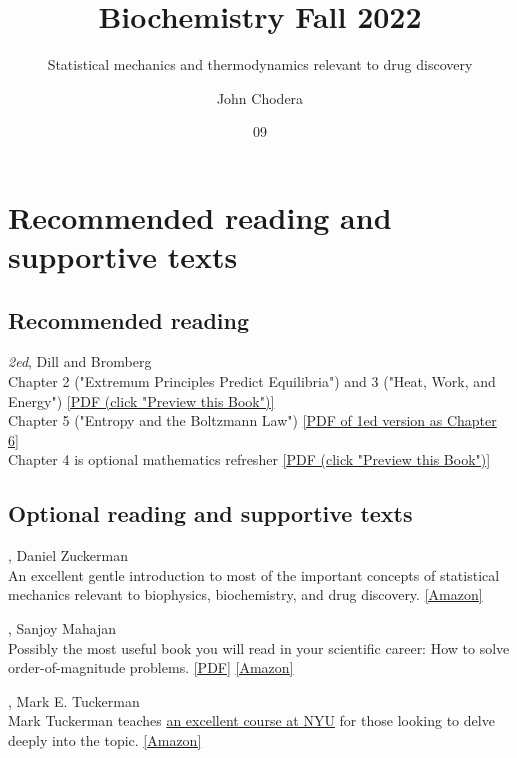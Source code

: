 \documentclass[english,course]{lecture}
\title{Biochemistry Fall 2022}
\subtitle{Statistical mechanics and thermodynamics relevant to drug discovery}
\author{John Chodera}
\date{09}{09}{2022}
\begin{document}
\vfill
\eject


\section{Recommended reading and supportive texts}

\subsection*{Recommended reading}

 \emph{2ed}, Dill and Bromberg\\
Chapter 2 ("Extremum Principles Predict Equilibria") and 3 ("Heat, Work, and Energy") \href{https://tinyurl.com/dill-bromberg-preview}{[PDF (click "Preview this Book")]}\\
Chapter 5 ("Entropy and the Boltzmann Law") \href{https://tinyurl.com/dill-bromberg-boltzmann}{[PDF of 1ed version as Chapter 6]}\\
Chapter 4 is optional mathematics refresher \href{https://tinyurl.com/dill-bromberg-preview}{[PDF (click "Preview this Book")]}

\subsection*{Optional reading and supportive texts}

, Daniel Zuckerman \\
An excellent gentle introduction to most of the important concepts of statistical mechanics relevant to biophysics, biochemistry, and drug discovery. 
\href{https://www.amazon.com/dp/B005H6YEBI}{[Amazon]} 

, Sanjoy Mahajan \\
Possibly the most useful book you will read in your scientific career: How to solve order-of-magnitude problems.
\href{https://tinyurl.com/street-fighting-mathematics}{[PDF]}
\href{https://www.amazon.com/exec/obidos/ASIN/026251429X}{[Amazon]}

, Mark E. Tuckerman \\
Mark Tuckerman teaches \href{http://www.nyu.edu/classes/tuckerman/stat.mech/}{an excellent course at NYU} for those looking to delve deeply into the topic.
\href{https://www.amazon.com/Statistical-Mechanics-Molecular-Simulation-Graduate/dp/0198525265}{[Amazon]}
\end{document}

